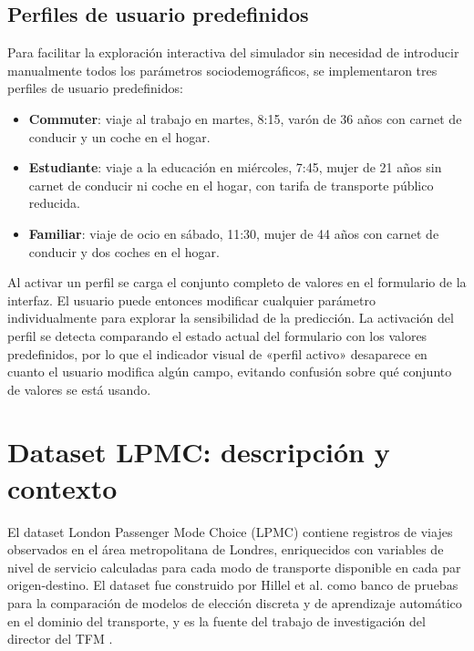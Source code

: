 \subsection{Perfiles de usuario predefinidos}

Para facilitar la exploración interactiva del simulador sin necesidad de introducir manualmente todos los parámetros sociodemográficos, se implementaron tres perfiles de usuario predefinidos:

\begin{itemize}
  \item \textbf{Commuter}: viaje al trabajo en martes, 8:15, varón de 36 años con carnet de conducir y un coche en el hogar.
  \item \textbf{Estudiante}: viaje a la educación en miércoles, 7:45, mujer de 21 años sin carnet de conducir ni coche en el hogar, con tarifa de transporte público reducida.
  \item \textbf{Familiar}: viaje de ocio en sábado, 11:30, mujer de 44 años con carnet de conducir y dos coches en el hogar.
\end{itemize}

Al activar un perfil se carga el conjunto completo de valores en el formulario de la interfaz. El usuario puede entonces modificar cualquier parámetro individualmente para explorar la sensibilidad de la predicción. La activación del perfil se detecta comparando el estado actual del formulario con los valores predefinidos, por lo que el indicador visual de «perfil activo» desaparece en cuanto el usuario modifica algún campo, evitando confusión sobre qué conjunto de valores se está usando.

\section{Dataset LPMC: descripción y contexto}
\label{sec:impl_lpmc_dataset}

El dataset London Passenger Mode Choice (LPMC) \cite{Hillel2018LPMC,CSLPMC2019} contiene registros de viajes observados en el área metropolitana de Londres, enriquecidos con variables de nivel de servicio calculadas para cada modo de transporte disponible en cada par origen-destino. El dataset fue construido por Hillel et al. como banco de pruebas para la comparación de modelos de elección discreta y de aprendizaje automático en el dominio del transporte, y es la fuente del trabajo de investigación del director del TFM \cite{MartinBaos2023Thesis,MartinBaos2023TRC}.

